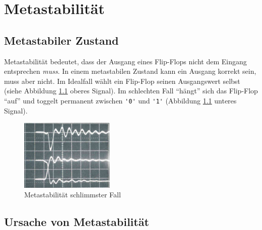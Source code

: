 
\chapter{Metastabilität}\label{chap.metastabilitat}

\section{Metastabiler Zustand}\label{sect.meatastabil_def}

Metastabilität bedeutet, dass der Ausgang eines Flip-Flops nicht dem Eingang entsprechen \textit{muss}. In einem metastabilen Zustand kann ein Ausgang korrekt sein, muss aber nicht. Im Idealfall wählt ein Flip-Flop seinen Ausgangswert selbst (siehe Abbildung \ref{fig.metastabil.schlimmster_Fall} oberes Signal). Im schlechten Fall ``hängt'' sich das Flip-Flop “auf” und toggelt permanent zwischen \lstinline|'0'| und \lstinline|'1'| (Abbildung \ref{fig.metastabil.schlimmster_Fall} unteres Signal).

\begin{figure}[H]
	\includegraphics[width=0.4\textwidth]{images/metastability/metastability_2_IO.png}
	\caption{Metastabilität schlimmster Fall \citep{F_metastability}}
	\label{fig.metastabil.schlimmster_Fall}
\end{figure}


\section{Ursache von Metastabilität}\label{sect.meatastabil_ursache}

